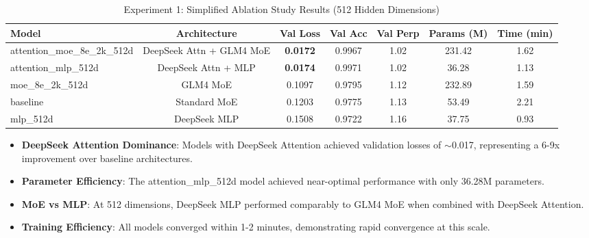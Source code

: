 \begin{table}[h]
\centering
\caption{Experiment 1: Simplified Ablation Study Results (512 Hidden Dimensions)}
\label{tab:exp1_results}
\begin{tabular}{lcccccc}
\toprule
\textbf{Model} & \textbf{Architecture} & \textbf{Val Loss} & \textbf{Val Acc} & \textbf{Val Perp} & \textbf{Params (M)} & \textbf{Time (min)} \\
\midrule
attention\_moe\_8e\_2k\_512d & DeepSeek Attn + GLM4 MoE & \textbf{0.0172} & 0.9967 & 1.02 & 231.42 & 1.62 \\
attention\_mlp\_512d & DeepSeek Attn + MLP & \textbf{0.0174} & 0.9971 & 1.02 & 36.28 & 1.13 \\
moe\_8e\_2k\_512d & GLM4 MoE & 0.1097 & 0.9795 & 1.12 & 232.89 & 1.59 \\
baseline & Standard MoE & 0.1203 & 0.9775 & 1.13 & 53.49 & 2.21 \\
mlp\_512d & DeepSeek MLP & 0.1508 & 0.9722 & 1.16 & 37.75 & 0.93 \\
\bottomrule
\end{tabular}
\end{table}

\begin{itemize}
\item \textbf{DeepSeek Attention Dominance}: Models with DeepSeek Attention achieved validation losses of $\sim$0.017, representing a 6-9x improvement over baseline architectures.
\item \textbf{Parameter Efficiency}: The attention\_mlp\_512d model achieved near-optimal performance with only 36.28M parameters.
\item \textbf{MoE vs MLP}: At 512 dimensions, DeepSeek MLP performed comparably to GLM4 MoE when combined with DeepSeek Attention.
\item \textbf{Training Efficiency}: All models converged within 1-2 minutes, demonstrating rapid convergence at this scale.
\end{itemize}
